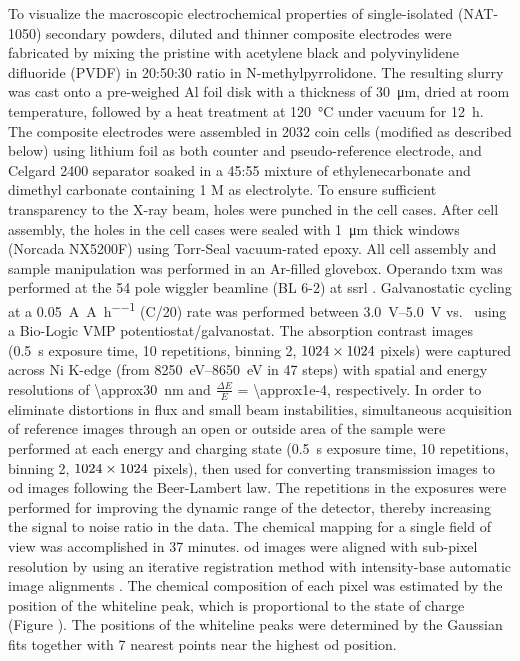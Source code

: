 \documentclass{WileyMSP-template}
\begin{document}
To visualize the macroscopic electrochemical properties of
single-isolated \nca{} (NAT-1050) secondary powders, diluted and
thinner composite electrodes were fabricated by mixing the pristine
\nca{} with acetylene black and polyvinylidene difluoride (PVDF) in
20:50:30 ratio in N-methylpyrrolidone. The resulting slurry was cast
onto a pre-weighed Al foil disk with a thickness of
\SI{30}{\micro\meter}, dried at room temperature, followed by a heat
treatment at \SI{120}{\celsius} under vacuum for \SI{12}{\hour}. The
composite electrodes were assembled in 2032 coin cells (modified as
described below) using lithium foil as both counter and
pseudo-reference electrode, and Celgard 2400 separator soaked in a
45:55 mixture of ethylenecarbonate and dimethyl carbonate containing 1
M  as electrolyte. To ensure sufficient transparency to the
X-ray beam, holes were punched in the cell cases. After cell assembly,
the holes in the cell cases were sealed with \SI{1}{\micro\meter}
thick  windows (Norcada NX5200F) using Torr-Seal
vacuum-rated epoxy. All cell assembly and sample manipulation was
performed in an Ar-filled glovebox. Operando \gls{txm} was performed
at the 54 pole wiggler beamline (BL 6-2) at \gls{ssrl}
\cite{yun2008}. Galvanostatic cycling at a
\SI{0.05}{\ampere\per\ampere\per\hour} (C/20) rate was performed
between \SIrange{3.0}{5.0}{\volt} vs.\  using a Bio-Logic
VMP potentiostat/galvanostat. The absorption contrast images
(\SI{0.5}{\second} exposure time, 10 repetitions, binning 2, $\rm
1024\times 1024$ pixels) were captured across Ni K-edge (from
\SIrange{8250}{8650}{\electronvolt} in 47 steps) with spatial and
energy resolutions of \SI{\approx30}{\nano\meter} and $\frac{\Delta
  E}{E}$ = \num{\approx1e-4}, respectively. In order to eliminate
distortions in flux and small beam instabilities, simultaneous
acquisition of reference images through an open or outside area of the
sample were performed at each energy and charging state
(\SI{0.5}{\second} exposure time, 10 repetitions, binning 2, $\rm 1024
\times 1024$ pixels), then used for converting transmission images to
\gls{od} images following the Beer-Lambert law. The repetitions in the
exposures were performed for improving the dynamic range of the
detector, thereby increasing the signal to noise ratio in the
data. The chemical mapping for a single field of view was accomplished
in 37 minutes. \Gls{od} images were aligned with sub-pixel resolution
by using an iterative registration method with intensity-base
automatic image alignments \cite{lee2019-3}. The chemical composition
of each pixel was estimated by the position of the whiteline peak,
which is proportional to the state of charge (Figure
). The positions of the whiteline
peaks were determined by the Gaussian fits together with 7 nearest
points near the highest \gls{od} position.
\end{document}
